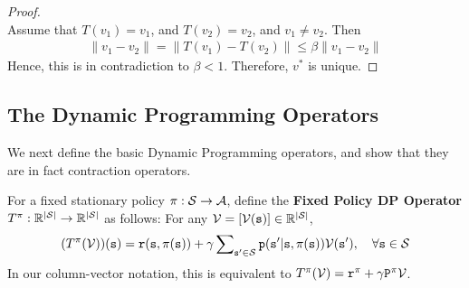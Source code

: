\begin{proof}
\bigskip
{}\\
Assume that $T(v_1) = v_1$, and $T(v_2) = v_2$, and $v_1 \neq v_2$.
Then
\begin{eqnarray*}
  \|v_1-v_2\|=\|T(v_1)-T(v_2)\| \leq \beta\|v_1-v_2\|
\end{eqnarray*}
Hence, this is in contradiction to $\beta<1$. Therefore, $v^*$ is
unique.
%
\end{proof}


\subsection{The Dynamic Programming Operators}\label{ss:DP_op}
We next define the basic Dynamic Programming operators, and show that they are in fact contraction operators.

For a fixed stationary policy $\pi :\mathcal{S} \to \mathcal{A}$,
define the \textbf{Fixed Policy DP Operator} $T^\pi:\mathbb{R}^{|\mathcal{S}|}
\to \mathbb{R}^{|\mathcal{S}|}$ as follows: For any $\mathcal{V}=\left[\mathcal{V}({\tt s})\right]\in
\mathbb{R}^{|\mathcal{S}|}$,
\[(T_{}^\pi (\mathcal{V}))({\tt s}) = {\tt r}({\tt s},\pi({\tt s})) + \gamma \sum\nolimits_{{\tt s}' \in \mathcal{S}} {{\tt p}({\tt s}'|{\tt s},\pi ({\tt s}))\mathcal{V}({\tt s}')} ,\quad\forall {\tt s} \in \mathcal{S}\]
In our column-vector notation, this is equivalent to  $T^\pi
(\mathcal{V}) = {{\tt r}^\pi } + \gamma {{\tt P}^\pi}\mathcal{V}$.

